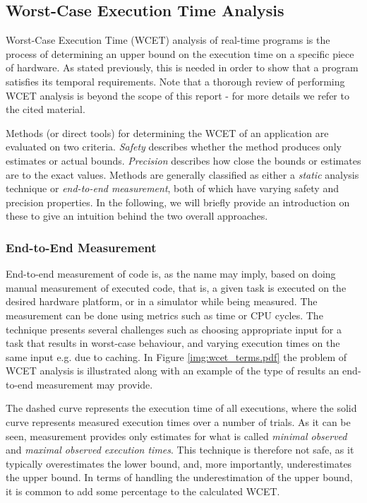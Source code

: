 
\subsection{Worst-Case Execution Time Analysis} %
\label{sub:worst_case_execution_time_analysis}
Worst-Case Execution Time (WCET) analysis of real-time programs is the process of determining an upper bound on the execution time on a specific piece of hardware\cite{Wilhelm:2008}. As stated previously, this is needed in order to show that a program satisfies its temporal requirements. Note that a thorough review of performing WCET analysis is beyond the scope of this report - for more details we refer to the cited material.

Methods (or direct tools) for determining the WCET of an application are evaluated on two criteria. \textit{Safety} describes whether the method produces only estimates or actual bounds. \textit{Precision} describes how close the bounds or estimates are to the exact values. Methods are generally classified as either a \textit{static} analysis technique or \textit{end-to-end measurement}, both of which have varying safety and precision properties. In the following, we will briefly provide an introduction on these to give an intuition behind the two overall approaches.

\subsubsection{End-to-End Measurement}
End-to-end measurement of code is, as the name may imply, based on doing manual measurement of executed code, that is, a given task is executed on the desired hardware platform, or in a simulator while being measured. The measurement can be done using metrics such as time or CPU cycles. The technique presents several challenges such as choosing appropriate input for a task that results in worst-case behaviour, and varying execution times on the same input e.g. due to caching.
In Figure \ref{img:wcet_terms.pdf} the problem of WCET analysis is illustrated along with an example of the type of results an end-to-end measurement may provide.


The dashed curve represents the execution time of all executions, where the solid curve represents measured execution times over a number of trials. As it can be seen, measurement provides only estimates for what is called \textit{minimal observed} and \textit{maximal observed execution times}. This technique is therefore not safe, as it typically overestimates the lower bound, and, more importantly, underestimates the upper bound. In terms of handling the underestimation of the upper bound, it is common to add some percentage to the calculated WCET. 

